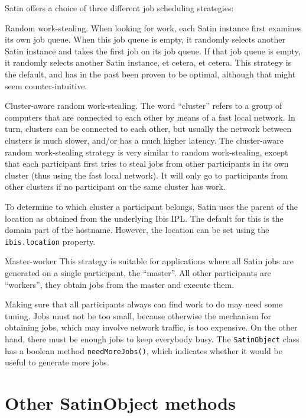 \documentclass[10pt]{article}
\begin{document}
Satin offers a choice of three different job scheduling strategies:
\begin{description}
\item{Random work-stealing}.
When looking for work, each Satin instance
first examines its own job queue. When this job queue is empty,
it randomly selects another Satin instance and takes the first job on its job queue.
If that job queue is empty, it randomly selects another Satin instance, et cetera,
et cetera.  This strategy is the default, and has in the past been proven
to be optimal, although that might seem counter-intuitive.

\item{Cluster-aware random work-stealing}.
The word ``cluster'' refers to a group of computers that are connected
to each other by means of a fast local network.
In turn, clusters can be connected to each other, but usually the
network between clusters is much slower, and/or has a much higher latency.
The cluster-aware random work-stealing strategy
is very similar to random work-stealing, except that
each participant first tries to steal jobs from other participants in its
own cluster (thus using the fast local network).
It will only go to participants from other clusters if no participant on the
same cluster has work.

To determine to which cluster a participant belongs, Satin uses the
parent of the location as obtained from the underlying Ibis IPL.
The default for this is the domain part of the hostname. However,
the location can be set using the \texttt{ibis.location} property.

\item{Master-worker}
This strategy is suitable for applications where all Satin jobs are
generated on a single participant, the ``master''. All other participants
are ``workers'', they obtain jobs from the master and execute them.
\end{description}

Making sure that all participants always can find work to do may need
some tuning. Jobs must not be too small, because otherwise the mechanism
for obtaining jobs, which may involve network traffic, is too expensive.
On the other hand, there must be enough jobs to keep everybody busy.
The \texttt{SatinObject} class has a boolean method \texttt{needMoreJobs()},
which indicates whether it would be useful to generate more jobs.

\section{Other SatinObject methods}
\end{document}

